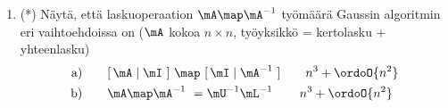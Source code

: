 \begin{enumerate}
\item (*) \label{H-m-3: työmääriä 2}
Näytä, että laskuoperaation $\mA\map\mA^{-1}$ työmäärä Gaussin algoritmin eri vaihtoehdoissa on
($\mA$ kokoa $n \times n$, työyksikkö = kertolasku + yhteenlasku)
\begin{align*}
\text{a)} \qquad &[\,\mA \mid \mI\ ]\ \map\ [\,\mI \mid \mA^{-1}\ ] \qquad n^3+\ordoO{n^2} \\
\text{b)} \qquad &\mA\map\mA^{-1}\ = \mU^{-1}\mL^{-1} \qquad\, n^3+\ordoO{n^2}
\end{align*}

\end{enumerate}

